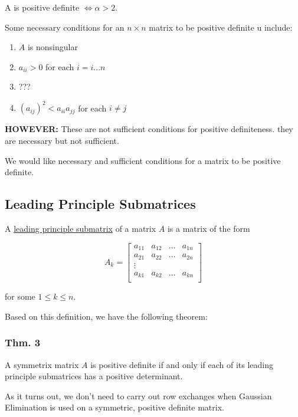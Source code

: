 \documentclass[12pt]{article}
\begin{document}
A is positive definite $\iff \alpha > 2$.

Some necessary conditions for an $n\times n$ matrix to be positive definite u
include:

\begin{enumerate}[label=(\alph*)]
\item $A$ is nonsingular
\item $a_{ii} > 0$ for each $i=i...n$ 
\item ???
\item $(a_{ij})^2 < a_{ii} a_{jj}$ for each $i\ne j$
\end{enumerate}

\textbf{HOWEVER:} These are not sufficient conditions for positive definiteness.
they are necessary but not sufficient.

We would like necessary and sufficient conditions for a matrix to be positive
definite.

\subsection{Leading Principle Submatrices}

A \uline{leading principle submatrix} of a matrix $A$ is a matrix of the form

\begin{equation*}
  A_k = \begin{bmatrix}
    a_{11} & a_{12} & \dots & a_{1n}\\
    a_{21} & a_{22} & \dots & a_{2n}\\
   \vdots&  &  & \\
   a_{k1} & a_{k2} & \dots & a_{kn}\\
  \end{bmatrix}
\end{equation*}

for some $1 \leq k \leq n$.

Based on this definition, we have the following theorem:

\subsubsection{Thm. 3}

A symmetrix matrix $A$ is positive definite if and only if each of its leading
principle submatrices has a positive determinant.

As it turns out, we don't need to carry out row exchanges when Gaussian
Elimination is used on a symmetric, positive definite matrix.
\end{document}
